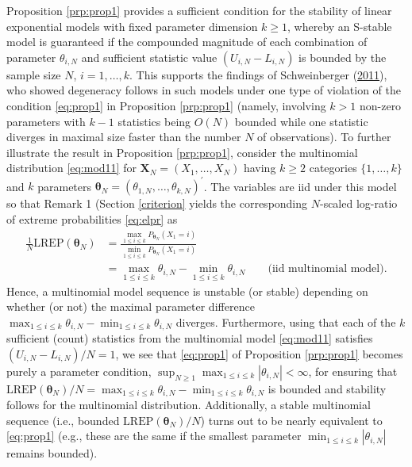\documentclass[]{article}
\theoremstyle{definition}
\newcommand{\REP}{\mathrm{LREP}}
\begin{document}
Proposition \ref{prp:prop1} provides a sufficient condition for the
stability of linear exponential models with fixed parameter dimension
\(k\geq 1\), whereby an S-stable model is guaranteed if the compounded
magnitude of each combination of parameter \(\theta_{i,N}\) and
sufficient statistic value \((U_{i,N}-L_{i,N})\) is bounded by the
sample size \(N\), \(i=1,\ldots,k\). This supports the findings of
Schweinberger
(\protect\hyperlink{ref-schweinberger2011instability}{2011}), who showed
degeneracy follows in such models under one type of violation of the
condition \eqref{eq:prop1} in Proposition \ref{prp:prop1} (namely,
involving \(k>1\) non-zero parameters with \(k-1\) statistics being
\(O(N)\) bounded while one statistic diverges in maximal size faster
than the number \(N\) of observations). To further illustrate the result
in Proposition \ref{prp:prop1}, consider the multinomial distribution
\eqref{eq:mod11} for \(\boldsymbol X_N=(X_1,\ldots,X_N)\) having
\(k\geq 2\) categories \(\{1,\ldots,k\}\) and \(k\) parameters
\(\boldsymbol \theta_N = (\theta_{1,N},\ldots,\theta_{k,N})^\prime\).
The variables are iid under this model so that Remark 1 (Section
\ref{criterion} yields the corresponding \(N\)-scaled log-ratio of
extreme probabilities \eqref{eq:elpr} as
\begin{align*}
  \frac{1}{N}\REP(\boldsymbol \theta_N) &= \frac{\max_{1 \leq i \leq k} P_{\boldsymbol \theta_N}(X_1=i)}{\min_{1 \leq i \leq k} P_{\boldsymbol \theta_N}(X_1=i)}\\
  &= \max_{1 \leq i \leq k} \theta_{i,N} - \min_{1 \leq i \leq k} \theta_{i,N} \qquad \mbox{(iid multinomial model)}.
\end{align*}
Hence, a multinomial model sequence is unstable (or stable) depending on
whether (or not) the maximal parameter difference
\(\max_{1 \leq i \leq k} \theta_{i,N} - \min_{1 \leq i \leq k} \theta_{i,N}\)
diverges. Furthermore, using that each of the \(k\) sufficient (count)
statistics from the multinomial model \eqref{eq:mod11} satisfies
\((U_{i,N}-L_{i,N})/N=1\), we see that \eqref{eq:prop1} of Proposition
\ref{prp:prop1} becomes purely a parameter condition,
\(\sup_{N \geq 1}\max_{1 \leq i \leq k } |\theta_{i,N}| <\infty\), for
ensuring that
\(\REP(\boldsymbol \theta_N)/N =\max_{1 \leq i \leq k} \theta_{i,N} - \min_{1 \leq i \leq k} \theta_{i,N}\)
is bounded and stability follows for the multinomial distribution.
Additionally, a stable multinomial sequence (i.e., bounded
\(\REP(\boldsymbol \theta_N)/N\)) turns out to be nearly equivalent to
\eqref{eq:prop1} (e.g., these are the same if the smallest parameter
\(\min_{1 \leq i \leq k } |\theta_{i,N}|\) remains bounded).
\end{document}
